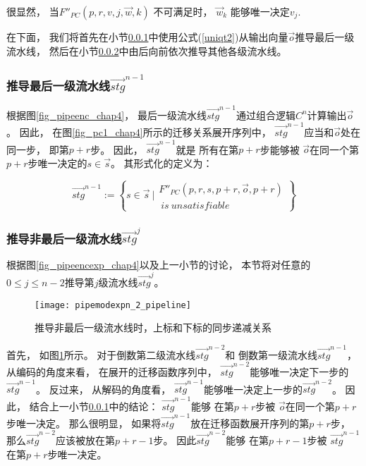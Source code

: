 很显然，
当$F''_{PC}(p,r,v,j,\vec{w},k)$ 不可满足时，
$\vec{w}_k$ 能够唯一决定$v_j$.

在下面，
我们将首先在小节\ref{subsub_last}中使用公式(\ref{uniqt2})从输出向量$\vec{o}$推导最后一级流水线，
然后在小节\ref{subsub_notlast}中由后向前依次推导其他各级流水线。

\subsubsection{推导最后一级流水线$\vec{stg}^{n-1}$}\label{subsub_last}
根据图\ref{fig_pipeenc_chap4}，
最后一级流水线$\vec{stg}^{n-1}$通过组合逻辑$C^n$计算输出$\vec{o}$。
因此，
在图\ref{fig_pc1_chap4}所示的迁移关系展开序列中，
$\vec{stg}^{n-1}$应当和$\vec{o}$处在同一步，
即第$p+r$步。
因此，
$\vec{stg}^{n-1}$就是
所有在第$p+r$步能够被
$\vec{o}$在同一个第$p+r$步唯一决定的$s\in \vec{s}$。
其形式化的定义为：

\begin{equation}\label{stgn_1}
 \vec{stg}^{n-1} :=
\left\{
 s\in \vec{s} ~|
\begin{array}{cc}
 F''_{PC}(p,r,
 s,p+r,
 \vec{o},p+r)\\
 ~is~unsatisfiable
\end{array}
\right\}
\end{equation}

\subsubsection{推导非最后一级流水线$\vec{stg}^{j}$}\label{subsub_notlast}

根据图\ref{fig_pipeencexp_chap4}以及上一小节的讨论，
本节将对任意的$0\le j\le n-2$推导第$j$级流水线$\vec{stg}^{j}$。



\begin{figure}[t]
\begin{center}
\texttt{[image: pipemodexpn\_2\_pipeline]}
\end{center}
\caption{推导非最后一级流水线时，上标和下标的同步递减关系}
  \label{fig_pipemodexpn_2_pipeline}
\end{figure}

首先，
如图\ref{fig_pipemodexpn_2_pipeline}所示。
对于倒数第二级流水线$\vec{stg}^{n-2}$和
倒数第一级流水线$\vec{stg}^{n-1}$，
从编码的角度来看，
在展开的迁移函数序列中，
$\vec{stg}^{n-2}$能够唯一决定下一步的$\vec{stg}^{n-1}$。
反过来，
从解码的角度看，
$\vec{stg}^{n-1}$能够唯一决定上一步的$\vec{stg}^{n-2}$。
因此，
结合上一小节\ref{subsub_last}中的结论：
$\vec{stg}^{n-1}$能够
在第$p+r$步被
$\vec{o}$在同一个第$p+r$步唯一决定。
那么很明显，
如果将$\vec{stg}^{n-1}$放在迁移函数展开序列的第$p+r$步，
那么$\vec{stg}^{n-2}$应该被放在第$p+r-1$步。
因此$\vec{stg}^{n-2}$能够
在第$p+r-1$步被
$\vec{stg}^{n-1}$在第$p+r$步唯一决定。

